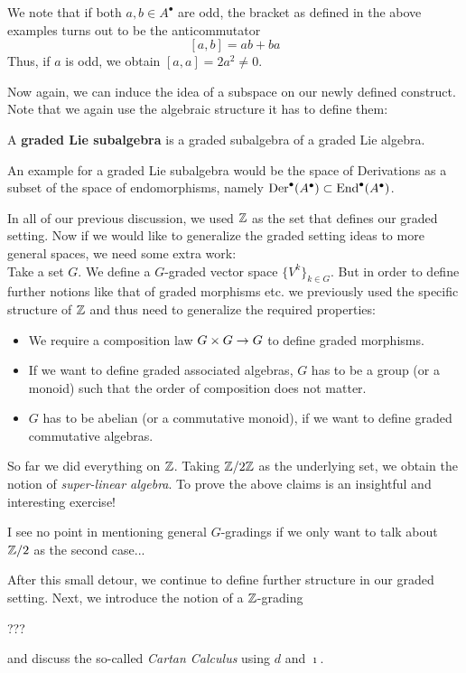 \begin{rem}
  We note that if both $a,b \in A^\bullet$ are odd, the bracket as defined in the above examples turns out to be the anticommutator
  $$ [a,b] = ab+ba $$ Thus, if $a$ is odd, we obtain $[a,a] = 2a^2 \neq 0$.
\end{rem}

Now again, we can induce the idea of a subspace on our newly defined construct. Note that we again use the algebraic structure it has to define them:

\begin{definition}
  A \textbf{graded Lie subalgebra} is a graded subalgebra of a graded Lie algebra.
\end{definition}

An example for a graded Lie subalgebra would be the space of Derivations as a subset of the space of endomorphisms, namely $\operatorname{Der}^\bullet(A^\bullet) \subset \operatorname{End}^\bullet(A^\bullet)$.

\begin{rem}
  In all of our previous discussion, we used $\mathbb{Z}$ as the set that defines our graded setting. Now if we would like to generalize the graded setting ideas to more general spaces, we need some extra work:\\

  Take a set $G$. We define a $G$-graded vector space $\{V^k\}_{k \in G}$. But in order to define further notions like that of graded morphisms etc. we previously used the specific structure of $\mathbb{Z}$ and thus need to generalize the required properties:
  \begin{itemize}
    \item We require a composition law $G \times G \rightarrow G$ to define graded morphisms.
    \item If we want to define graded associated algebras, $G$ has to be a group (or a monoid) such that the order of composition does not matter.
    \item $G$ has to be abelian (or a commutative monoid), if we want to define graded commutative algebras.
  \end{itemize}
  So far we did everything on $\mathbb{Z}$. Taking $\mathbb{Z} / 2\mathbb{Z}$ as the underlying set, we obtain the notion of \emph{super-linear algebra}. To prove the above claims is an insightful and interesting exercise!
\end{rem}
\begin{mdframed}
I see no point in mentioning general $G$-gradings if we only want to talk about $\mathbb{Z}/2$ as the second case...
\end{mdframed}
After this small detour, we continue to define further structure in our graded setting. Next, we introduce the notion of a $\mathbb{Z}$-grading \begin{mdframed}
???
\end{mdframed} and discuss the so-called \emph{Cartan Calculus} using $d$ and $\imath$.

